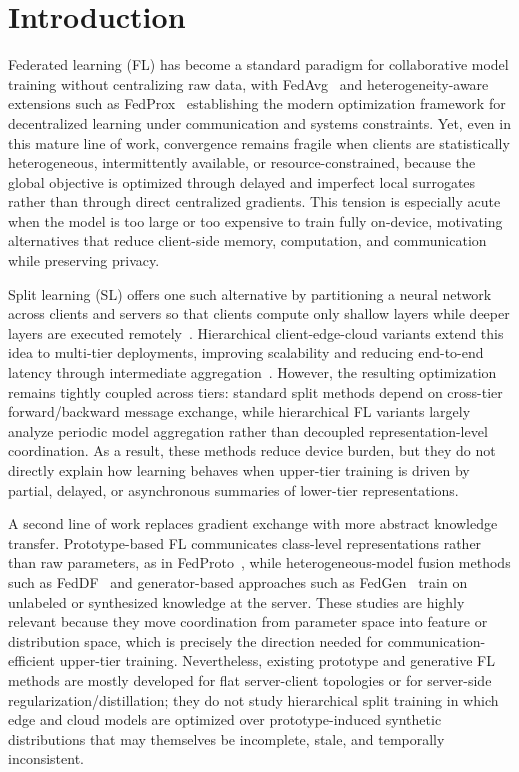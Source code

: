 \section{Introduction}
Federated learning (FL) has become a standard paradigm for collaborative model training without centralizing raw data, with FedAvg~\cite{mcmahan2017communication} and heterogeneity-aware extensions such as FedProx~\cite{li2020federated} establishing the modern optimization framework for decentralized learning under communication and systems constraints. Yet, even in this mature line of work, convergence remains fragile when clients are statistically heterogeneous, intermittently available, or resource-constrained, because the global objective is optimized through delayed and imperfect local surrogates rather than through direct centralized gradients. This tension is especially acute when the model is too large or too expensive to train fully on-device, motivating alternatives that reduce client-side memory, computation, and communication while preserving privacy. 

Split learning (SL) offers one such alternative by partitioning a neural network across clients and servers so that clients compute only shallow layers while deeper layers are executed remotely~\cite{vepakomma2018split}. Hierarchical client-edge-cloud variants extend this idea to multi-tier deployments, improving scalability and reducing end-to-end latency through intermediate aggregation~\cite{liu2020client}. However, the resulting optimization remains tightly coupled across tiers: standard split methods depend on cross-tier forward/backward message exchange, while hierarchical FL variants largely analyze periodic model aggregation rather than decoupled representation-level coordination. As a result, these methods reduce device burden, but they do not directly explain how learning behaves when upper-tier training is driven by partial, delayed, or asynchronous summaries of lower-tier representations. 

A second line of work replaces gradient exchange with more abstract knowledge transfer. Prototype-based FL communicates class-level representations rather than raw parameters, as in FedProto~\cite{tan2022fedproto}, while heterogeneous-model fusion methods such as FedDF~\cite{lin2020ensemble} and generator-based approaches such as FedGen~\cite{zhu2021data} train on unlabeled or synthesized knowledge at the server. These studies are highly relevant because they move coordination from parameter space into feature or distribution space, which is precisely the direction needed for communication-efficient upper-tier training. Nevertheless, existing prototype and generative FL methods are mostly developed for flat server-client topologies or for server-side regularization/distillation; they do not study hierarchical split training in which edge and cloud models are optimized over prototype-induced synthetic distributions that may themselves be incomplete, stale, and temporally inconsistent. 

